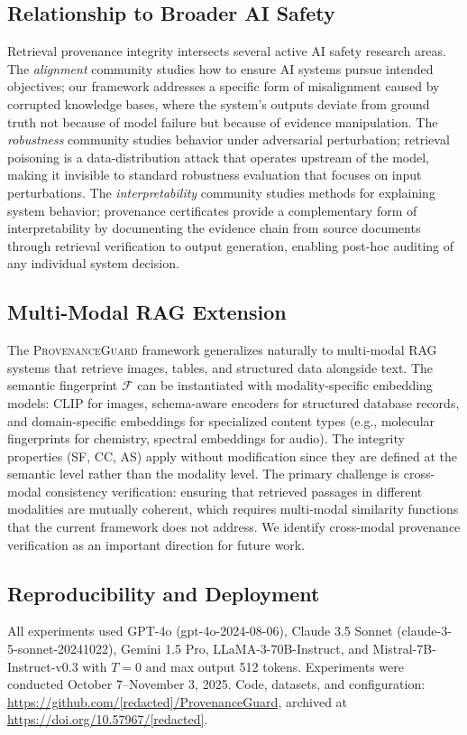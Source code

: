 \documentclass[journal,10pt]{IEEEtran}
\newcommand{\calF}{\mathcal{F}}
\begin{document}
\subsection{Relationship to Broader AI Safety}
Retrieval provenance integrity intersects several active AI safety research areas. The \emph{alignment} community studies how to ensure AI systems pursue intended objectives; our framework addresses a specific form of misalignment caused by corrupted knowledge bases, where the system's outputs deviate from ground truth not because of model failure but because of evidence manipulation. The \emph{robustness} community studies behavior under adversarial perturbation; retrieval poisoning is a data-distribution attack that operates upstream of the model, making it invisible to standard robustness evaluation that focuses on input perturbations. The \emph{interpretability} community studies methods for explaining system behavior; provenance certificates provide a complementary form of interpretability by documenting the evidence chain from source documents through retrieval verification to output generation, enabling post-hoc auditing of any individual system decision.

\subsection{Multi-Modal RAG Extension}
The \textsc{ProvenanceGuard} framework generalizes naturally to multi-modal RAG systems that retrieve images, tables, and structured data alongside text. The semantic fingerprint $\calF$ can be instantiated with modality-specific embedding models: CLIP for images, schema-aware encoders for structured database records, and domain-specific embeddings for specialized content types (e.g., molecular fingerprints for chemistry, spectral embeddings for audio). The integrity properties (SF, CC, AS) apply without modification since they are defined at the semantic level rather than the modality level. The primary challenge is cross-modal consistency verification: ensuring that retrieved passages in different modalities are mutually coherent, which requires multi-modal similarity functions that the current framework does not address. We identify cross-modal provenance verification as an important direction for future work.


\subsection{Reproducibility and Deployment}
All experiments used GPT-4o (gpt-4o-2024-08-06), Claude 3.5 Sonnet (claude-3-5-sonnet-20241022), Gemini 1.5 Pro, LLaMA-3-70B-Instruct, and Mistral-7B-Instruct-v0.3 with $T=0$ and max output 512 tokens. Experiments were conducted October 7--November 3, 2025. Code, datasets, and configuration: \url{https://github.com/[redacted]/ProvenanceGuard}, archived at \url{https://doi.org/10.57967/[redacted]}.
\end{document}
